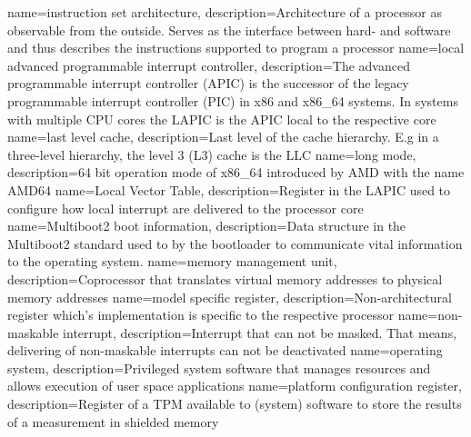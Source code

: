 {
  name=instruction set architecture,
  description={Architecture of a processor as observable from the outside. Serves as the interface between hard- and
  software and thus describes the instructions supported to program a processor}
}
%
{
  name=local advanced programmable interrupt controller,
  description={The advanced programmable interrupt controller (APIC) is the successor of the legacy programmable
    interrupt controller (PIC) in x86 and x86\_64 systems. In systems with multiple CPU cores the LAPIC is the
  APIC local to the respective core}
}
{
  name=last level cache,
  description={Last level of the cache hierarchy. E.g in a three-level hierarchy, the level 3 (L3) cache is the LLC}
}
{
  name=long mode,
  description={64 bit operation mode of x86\_64 introduced by AMD with the name AMD64}
}
{
  name=Local Vector Table,
  description={Register in the LAPIC used to configure how local interrupt are delivered to the processor core}
}
%
{
  name=Multiboot2 boot information,
  description={Data structure in the Multiboot2 standard used to by the bootloader to communicate vital information to
  the operating system.}
}
{
  name=memory management unit,
  description={Coprocessor that translates virtual memory addresses to physical memory addresses}
}
{
  name=model specific register,
  description={Non-architectural register which's implementation is specific to the respective processor}
}
%
{
  name=non-maskable interrupt,
  description={Interrupt that can not be masked. That means, delivering of non-maskable interrupts can not be
  deactivated}
}
%
{
  name=operating system,
  description={Privileged system software that manages resources and allows execution of user space applications}
}
%
{
  name=platform configuration register,
  description={Register of a TPM available to (system) software to store the results of a measurement in shielded
  memory}
}
